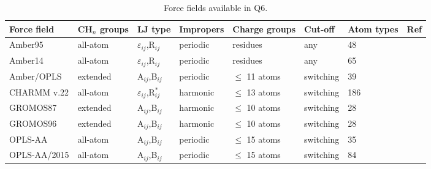 \documentclass[a4paper,11pt]{article}
\let\origcite\cite
\def\cite#1{\unskip~\origcite{#1}}
\begin{document}
\begin{table}[htbp]
\small \caption{Force fields available in Q6.} \label{tab:FF}
\begin{tabularx}{\textwidth}{|p{58pt}|p{40pt}|p{32pt}|p{50pt}|p{50pt}|l|p{27pt}|X|}
\hline \bf{Force field}\footnotemark[1] & \bf{CH$_n$
groups}\footnotemark[2] & \bf{LJ type}\footnotemark[3]
 & \bf{Impropers}\footnotemark[4] & \bf{Charge groups}\footnotemark[5] & \bf{Cut-off}\footnotemark[6]
 & \bf{Atom types}\footnotemark[7] & \bf{Ref}\\
\hline Amber95     & all-atom & $\varepsilon_{ij}$,R$_{ij}$     & periodic & residues        & any       & 48  & \cite{Cornell1995} \\
\hline Amber14     & all-atom & $\varepsilon_{ij}$,R$_{ij}$     & periodic & residues        & any       & 65  & \cite{Maier2015a} \\
\hline Amber/OPLS  & extended & A$_{ij}$,B$_{ij}$               & periodic & $\leq$ 11 atoms & switching & 39  & \cite{Jorgensen1988} \\
\hline CHARMM v.22 & all-atom & $\varepsilon_{ij}$,R$_{ij}^{*}$ & harmonic & $\leq$ 13 atoms & switching & 186 & \cite{Brooks1983} \\
\hline GROMOS87    & extended & A$_{ij}$,B$_{ij}$               & harmonic & $\leq$ 10 atoms & switching & 28  & \cite{gunsteren:87} \\
\hline GROMOS96    & extended & A$_{ij}$,B$_{ij}$               & harmonic & $\leq$ 10 atoms & switching & 28  & \cite{Gunsteren1996} \\
\hline OPLS-AA     & all-atom & A$_{ij}$,B$_{ij}$               & periodic & $\leq$ 15 atoms & switching & 35  & \cite{Jorgensen1996a}\\
\hline OPLS-AA/2015& all-atom & A$_{ij}$,B$_{ij}$               & periodic & $\leq$ 15 atoms & switching & 84  & \cite{Robertson2015a} \\
\hline
\end{tabularx}
\normalsize
\end{table}



\end{document}
